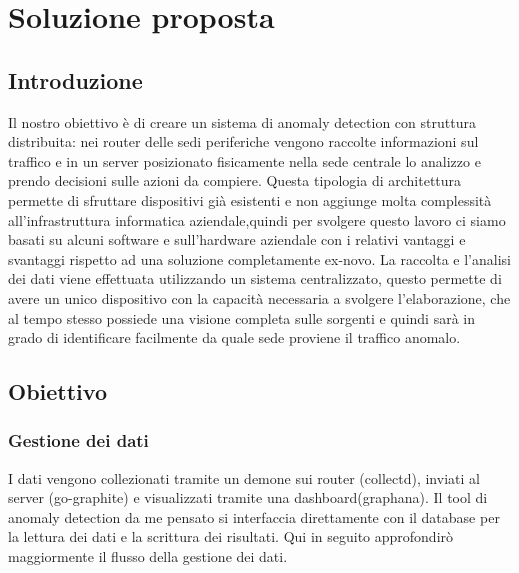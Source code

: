 \chapter{Soluzione proposta}

\section{Introduzione}
Il nostro obiettivo è di creare un sistema di anomaly detection con struttura distribuita: nei router delle sedi periferiche vengono raccolte informazioni sul traffico e in un server posizionato fisicamente nella sede centrale lo analizzo e prendo decisioni sulle azioni da compiere. Questa tipologia di architettura permette di sfruttare dispositivi già esistenti e non aggiunge molta complessità all'infrastruttura informatica aziendale,quindi per svolgere questo lavoro ci siamo basati su alcuni software e sull'hardware aziendale con i relativi vantaggi e svantaggi rispetto ad una soluzione completamente ex-novo.
La raccolta e l'analisi dei dati viene effettuata utilizzando un sistema centralizzato, questo permette di avere un unico dispositivo con la capacità necessaria a svolgere l'elaborazione, che al tempo stesso possiede una visione completa sulle sorgenti e quindi sarà in grado di identificare facilmente da quale sede proviene il traffico anomalo.

\section{Obiettivo}

\subsection{Gestione dei dati}

I dati vengono collezionati tramite un demone sui router (collectd), inviati al server (go-graphite) e visualizzati tramite una dashboard(graphana). Il tool di anomaly detection da me pensato si interfaccia direttamente con il database per la lettura dei dati e la scrittura dei risultati.
Qui in seguito approfondirò maggiormente il flusso della gestione dei dati.

